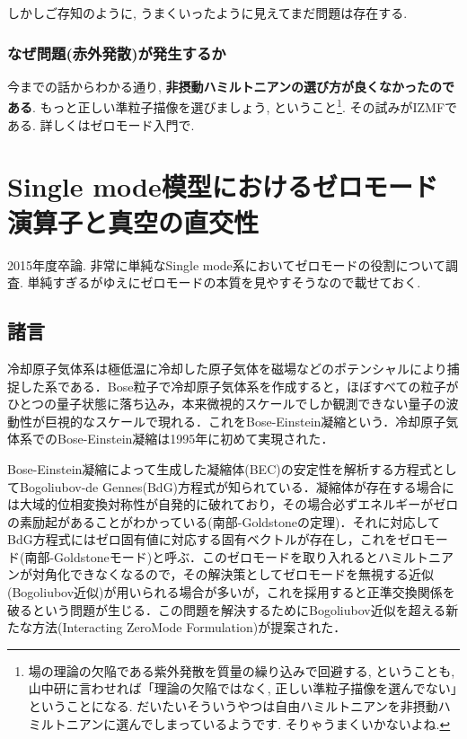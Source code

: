 \documentclass[10.5pt,a4paper]{jreport}
\begin{document}
しかしご存知のように, うまくいったように見えてまだ問題は存在する. 
\subsection{なぜ問題(赤外発散)が発生するか}
今までの話からわかる通り, \textbf{非摂動ハミルトニアンの選び方が良くなかったのである}.
もっと正しい準粒子描像を選びましょう, ということ\footnote{場の理論の欠陥である紫外発散を質量の繰り込みで回避する, ということも, 山中研に言わせれば「理論の欠陥ではなく, 正しい準粒子描像を選んでない」ということになる. だいたいそういうやつは自由ハミルトニアンを非摂動ハミルトニアンに選んでしまっているようです. そりゃうまくいかないよね. }. その試みがIZMFである. 詳しくはゼロモード入門で. 
\newpage
\chapter{Single mode模型におけるゼロモード演算子と真空の直交性}
2015年度卒論. 非常に単純なSingle mode系においてゼロモードの役割について調査. 単純すぎるがゆえにゼロモードの本質を見やすそうなので載せておく. 
\section{諸言}
冷却原子気体系は極低温に冷却した原子気体を磁場などのポテンシャルにより捕捉した系である．Bose粒子で冷却原子気体系を作成すると，ほぼすべての粒子がひとつの量子状態に落ち込み，本来微視的スケールでしか観測できない量子の波動性が巨視的なスケールで現れる．これをBose-Einstein凝縮という．冷却原子気体系でのBose-Einstein凝縮は1995年に初めて実現された\cite{BEC}．

Bose-Einstein凝縮によって生成した凝縮体(BEC)の安定性を解析する方程式としてBogoliubov-de Gennes(BdG)方程式\cite{bogoliubov,de-gennes}が知られている．凝縮体が存在する場合には大域的位相変換対称性が自発的に破れており，その場合必ずエネルギーがゼロの素励起があることがわかっている(南部-Goldstoneの定理)\cite{nambu,goldstone}．それに対応してBdG方程式にはゼロ固有値に対応する固有ベクトルが存在し，これをゼロモード(南部-Goldstoneモード)と呼ぶ\cite{lewenstein,matsumoto,mine}．このゼロモードを取り入れるとハミルトニアンが対角化できなくなるので，その解決策としてゼロモードを無視する近似(Bogoliubov近似)が用いられる場合が多いが，これを採用すると正準交換関係を破るという問題が生じる．この問題を解決するためにBogoliubov近似を超える新たな方法(Interacting ZeroMode Formulation)が提案された\cite{nakamura}．
\end{document}
